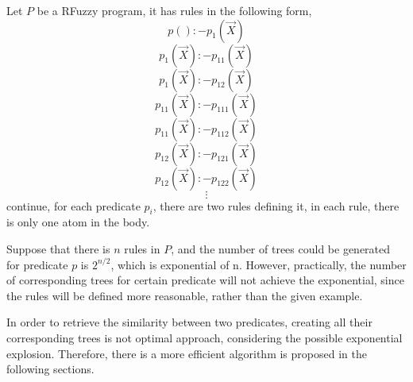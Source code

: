 Let $P$ be a RFuzzy program, it has rules in the following form,
\[p() :- p_1(\vec{X})\]
\[p_1(\vec{X}) :- p_{11}(\vec{X})\]
\[p_1(\vec{X}) :- p_{12}(\vec{X})\]
\[p_{11}(\vec{X}) :- p_{111}(\vec{X})\]
\[p_{11}(\vec{X}) :- p_{112}(\vec{X})\]
\[p_{12}(\vec{X}) :- p_{121}(\vec{X})\]
\[p_{12}(\vec{X}) :- p_{122}(\vec{X})\]
\[\vdots\]
continue, for each predicate $p_{i}$, there are two rules defining it, in each rule, there is only one atom in the body.

Suppose that there is $n$ rules in $P$, and the number of trees could be generated for predicate $p$ is $2^{n/2}$, which is exponential of n. However, practically, the number of corresponding trees for certain predicate will not achieve the exponential, since the rules will be defined more reasonable, rather than the given example.

In order to retrieve the similarity between two predicates, creating all their corresponding trees is not optimal approach, considering the possible exponential explosion.  Therefore, there is a more efficient algorithm is proposed in the following sections.  

